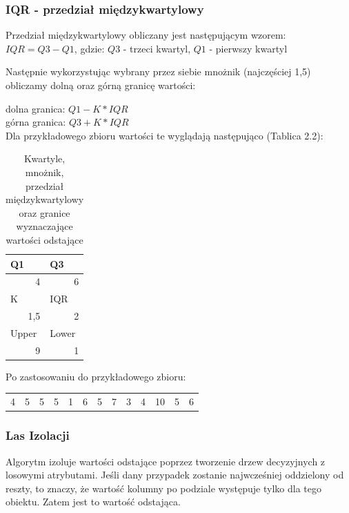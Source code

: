 \documentclass[oneside]{book}
\begin{document}
\subsubsection*{IQR - przedział międzykwartylowy}

Przedział międzykwartylowy obliczany jest następującym wzorem:
$IQR = Q3 - Q1$, gdzie: $Q3$ - trzeci kwartyl, $Q1$ - pierwszy kwartyl

Następnie wykorzystując wybrany przez siebie mnożnik (najczęściej 1,5) obliczamy dolną oraz górną granicę wartości:

dolna granica: $Q1 - K * IQR$ \\
górna granica: $Q3 + K * IQR$ \\

Dla przykładowego zbioru wartości te wyglądają następująco (Tablica 2.2):
\begin{table}[H]
    \begin{center}
    \begin{tabular}{|l|l|}
    \hline
    Q1                        & Q3                     \\ \hline
    \multicolumn{1}{|r|}{4}   & \multicolumn{1}{r|}{6} \\ \hline
    K                         & IQR                    \\ \hline
    \multicolumn{1}{|r|}{1,5} & \multicolumn{1}{r|}{2} \\ \hline
    Upper                     & Lower                  \\ \hline
    \multicolumn{1}{|r|}{9}   & \multicolumn{1}{r|}{1} \\ \hline
    \end{tabular}
    \caption{Kwartyle, mnożnik, przedział międzykwartylowy oraz granice wyznaczające wartości odstające}
    \end{center}
    \end{table}

Po zastosowaniu do przykładowego zbioru:

    \begin{table}[H]
    \begin{tabular}{rrrrrllllllll}
    4 & 5 & 5 & 5 & 1 & 6 & 5 & 7 & 3 & 4 & {\color[HTML]{FE0000} 10} & 5 & 6
    \end{tabular}
    \end{table}

\subsubsection*{Las Izolacji}
Algorytm izoluje wartości odstające poprzez tworzenie drzew decyzyjnych z losowymi atrybutami. 
Jeśli dany przypadek zostanie najwcześniej oddzielony od reszty, 
to znaczy, że wartość kolumny po podziale występuje tylko dla tego obiektu. 
Zatem jest to wartość odstająca.
\end{document}

